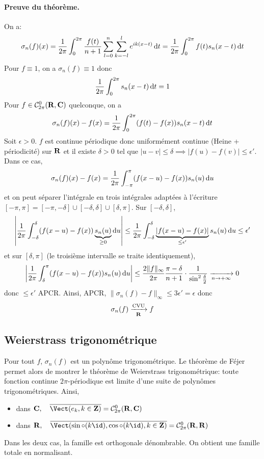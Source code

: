 \paragraph{Preuve du théorème.}
On a: \[
    \sigma_n(f)(x)=\frac{1}{2\pi}\int_0^{2\pi} \frac{f(t)}{n+1}\sum_{l=0}^n\sum_{k=-l}^l e^{ik(x-t)} \mathop{}\!\mathrm d t=\frac{1}{2\pi}\int_0^{2\pi} f(t)s_n(x-t)\mathop{}\!\mathrm d t
\] 
Pour $f\equiv 1$, on a  $\sigma_n(f)\equiv 1$ donc  \[
    \frac{1}{2\pi}\int_0^{2\pi} s_n(x-t)\mathop{}\!\mathrm d t=1
\] 
Pour $f \in  \mathcal  C^0_{2\pi}(\mathbf R, \mathbf C)$ quelconque, on a \[
    \sigma_n(f)(x)-f(x)=\frac{1}{2\pi}\int_0^{2\pi}(f(t)-f(x))s_n(x-t)\mathop{}\!\mathrm d t
\] 
Soit $\epsilon>0$.  $f$ est continue périodique donc uniformément continue (Heine + périodicité) sur  $\mathbf R$ et il existe $\delta>0$ tel que  $|u-v|\leq \delta \implies  |f(u)-f(v)|\leq \epsilon'$. Dans ce cas, \[
    \sigma_n(f)(x)-f(x)=\frac{1}{2\pi} \int_{-\pi}^\pi (f(x-u)-f(x))s_n(u)\mathop{}\!\mathrm d u
\] 
et on peut séparer l'intégrale en trois intégrales adaptées à l'écriture $[-\pi,\pi]=[-\pi,-\delta]\cup[-\delta, \delta]\cup [\delta, \pi]$. Sur $[-\delta, \delta]$,  \[
    \left| \frac{1}{2\pi}\int_{-\delta}^\delta (f(x-u)-f(x))\underbrace{s_n(u)}_{\geq 0}\mathop{}\!\mathrm d u\right|\leq \frac{1}{2\pi}\int_{-\delta}^\delta \underbrace{|f(x-u)-f(x)|}_{\leq \epsilon'} s_n(u)\mathop{}\!\mathrm d u\leq \epsilon'
\] 
et sur $[\delta, \pi]$ (le troisième intervalle se traite identiquement), \[
    \left| \frac{1}{2\pi}\int_{\delta}^\pi (f(x-u)-f(x)) s_n(u)\mathop{}\!\mathrm d u \right|\leq \frac{2 \|f\|_{\infty}}{2\pi} \frac{\pi-\delta}{n+1} \cdot \frac{1}{\sin^2  \frac{\delta}{2}} \xrightarrow[n\to+\infty]{}0
\] 
donc $\leq \epsilon'$ APCR. Ainsi, APCR, $\|\sigma_n(f)-f\|_\infty \leq 3\epsilon'=\epsilon$ donc \[
    \sigma_n(f) \xrightarrow[\mathbf R]{\text{CVU}}f
\] 

\subsection{Weierstrass trigonométrique}

Pour tout $f$, $\sigma_n(f)$ est un polynôme trigonométrique. Le théorème de Féjer permet alors de montrer le théorème de Weierstrass trigonométrique: toute fonction continue $2\pi$-périodique est limite d'une suite de polynômes trigonométriques. Ainsi, \begin{itemize}
    \item dans $ \C, \quad  \bar{\Vect(e_k, k \in  \Z)}=\mathcal  C^0_{2\pi}(\R, \C)$
    \item dans $ \R, \quad  \bar{\Vect(\sin\circ (k\id), \cos \circ (k\id), k \in  \Z)}=\mathcal  C^0_{2\pi}(\R, \R)$
\end{itemize}
Dans les deux cas, la famille est orthogonale dénombrable. On obtient une famille totale en normalisant.

